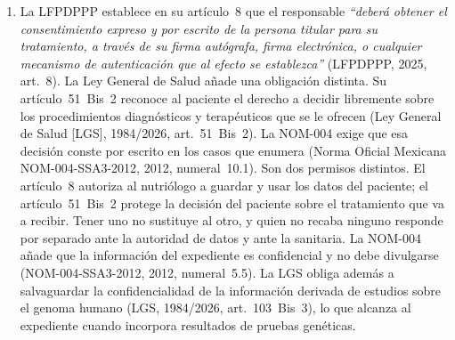 \documentclass[12pt, a4paper]{article}
\begin{document}
\begin{enumerate}[label=\Roman*.]
  \item La LFPDPPP establece en su artículo~8 que el responsable
  \textit{``deberá obtener el consentimiento expreso y por
  escrito de la persona titular para su tratamiento, a través
  de su firma autógrafa, firma electrónica, o cualquier mecanismo
  de autenticación que al efecto se establezca''} (LFPDPPP, 2025,
   art.~8). La Ley General de Salud añade una obligación distinta.
  Su artículo~51~Bis~2 reconoce al paciente el derecho a decidir
  libremente sobre los procedimientos diagnósticos y terapéuticos que se
  le ofrecen (Ley General de Salud [LGS], 1984/2026, art.~51~Bis~2). La
  NOM-004 exige que esa decisión conste por escrito en los casos que
  enumera (Norma Oficial Mexicana NOM-004-SSA3-2012, 2012, numeral~10.1).
  Son dos permisos
  distintos. El artículo~8 autoriza al nutriólogo a guardar y usar
  los datos del paciente; el artículo~51~Bis~2 protege la decisión
  del paciente sobre el tratamiento que va a recibir. Tener uno no
  sustituye al otro, y quien no recaba ninguno responde por
  separado ante la autoridad de datos y ante la sanitaria. La
  NOM-004 añade que la información del expediente es confidencial
  y no debe divulgarse (NOM-004-SSA3-2012, 2012, numeral~5.5). La
  LGS obliga además a salvaguardar la confidencialidad de la
  información derivada de estudios sobre el genoma humano (LGS,
  1984/2026, art.~103~Bis~3), lo que alcanza al expediente cuando
  incorpora resultados de pruebas genéticas.
 

\end{enumerate}
\end{document}
